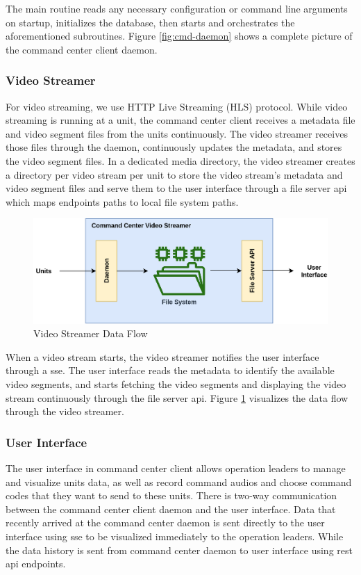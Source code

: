 The main routine reads any necessary configuration or command line arguments on startup, initializes the database, then starts and orchestrates the aforementioned subroutines. Figure \ref{fig:cmd-daemon} shows a complete picture of the command center client daemon.

\subsubsection{Video Streamer}
For video streaming, we use HTTP Live Streaming (HLS) protocol. While video streaming is running at a unit, the command center client receives a metadata file and video segment files from the units continuously. The video streamer receives those files through the daemon, continuously updates the metadata, and stores the video segment files. In a dedicated media directory, the video streamer creates a directory per video stream per unit to store the video stream's metadata and video segment files and serve them to the user interface through a file server \acrshort{api} which maps endpoints paths to local file system paths.

\begin{figure}[!htb]
    \centering
    \includegraphics[width=\linewidth]{images/video-streamer.png}
    \caption{Video Streamer Data Flow}
    \label{fig:video-streamer}
\end{figure} 

When a video stream starts, the video streamer notifies the user interface through a \acrshort{sse}. The user interface reads the metadata to identify the available video segments, and starts fetching the video segments and displaying the video stream continuously through the file server \acrshort{api}. Figure \ref{fig:video-streamer} visualizes the data flow through the video streamer.

\subsubsection{User Interface}
The user interface in command center client allows operation leaders to manage and visualize units data, as well as record command audios and choose command codes that they want to send to these units.
There is two-way communication between the command center client daemon and the user interface. Data that recently arrived at the command center daemon is sent directly to the user interface using \acrfull{sse} to be visualized immediately to the operation leaders. While the data history is sent from command center daemon to user interface using \acrfull{rest} \acrshort{api} endpoints. 

